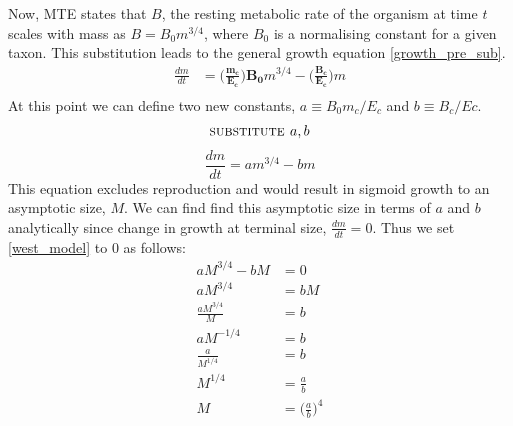 \documentclass[a4paper]{article} %
\begin{document}
Now, MTE states that $B$, the resting metabolic rate of the organism at time $t$ scales with mass as $B = B_{0}m^{3/4}$, where $B_0$ is a normalising constant for a given taxon. This substitution leads to the general growth equation \eqref{growth_pre_sub}.
\begin{align*}
    \frac{dm}{dt} &= \bm{\Bigg(\frac{m_c}{E_c}\Bigg)B_{0}}m^{3/4} - \bm{\Bigg(\frac{B_{c}}{E_c}\Bigg)}m \\
\end{align*}
At this point we can define two new constants, $a \equiv B_{0}m_{c}/E_{c}$ and $b \equiv B_{c}/E{c}$.
\begin{align*}
    \textsc{substitute }a, b
\end{align*}
\begin{equation}
    \frac{dm}{dt} = am^{3/4} - bm \label{west_model}
\end{equation}
This equation excludes reproduction and would result in sigmoid growth to an asymptotic size, $M$. We can find find this asymptotic size in terms of $a$ and $b$ analytically since change in growth at terminal size, $\frac{dm}{dt} = 0$. Thus we set \eqref{west_model} to 0 as follows:
\begin{align*}
    aM^{3/4} - bM &= 0 \\
    aM^{3/4} &= bM \\
    \frac{aM^{3/4}}{M} &= b \\
    aM^{-1/4} &= b \\
    \frac{a}{M^{1/4}} &= b \\
    M^{1/4} &= \frac{a}{b} \\
    M &= \Big(\frac{a}{b}\Big)^4
\end{align*}
\end{document}
